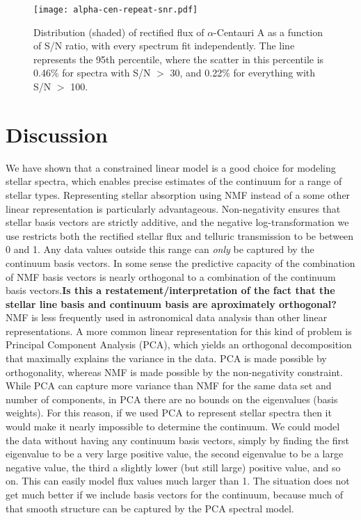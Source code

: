 \documentclass[modern]{aastex631}
\newcommand{\ajw}[1]{\textbf{#1}}
\begin{document}
\begin{figure}
    \texttt{[image: alpha-cen-repeat-snr.pdf]}
    \caption{Distribution (shaded) of rectified flux of $\alpha$-Centauri A as a function of S/N ratio, with every spectrum fit independently. The line represents the 95th percentile, where the scatter in this percentile is 0.46\% for spectra with S/N $>$ 30, and 0.22\% for everything with S/N $>$ 100. \label{fig:alpha-cen-wrt-snr}}
\end{figure}

\section{Discussion}\label{sec:discussion}

We have shown that a constrained linear model is a good choice for modeling stellar spectra, which enables precise estimates of the continuum for a range of stellar types. Representing stellar absorption using NMF instead of a some other linear representation is particularly advantageous. Non-negativity ensures that stellar basis vectors are strictly additive, and the negative log-transformation we use restricts both the rectified stellar flux and telluric transmission to be between 0 and 1. Any data values outside this range can \emph{only} be captured by the continuum basis vectors. In some sense the predictive capacity of the combination of NMF basis vectors is nearly orthogonal to a combination of the continuum basis vectors.\ajw{Is this a restatement/interpretation of the fact that the stellar line basis and continuum basis are aproximately orthogonal?}\\

NMF is less frequently used in astronomical data analysis than other linear representations. A more common linear representation for this kind of problem is Principal Component Analysis (PCA), which yields an orthogonal decomposition that maximally explains the variance in the data. PCA is made possible by orthogonality, whereas NMF is made possible by the non-negativity constraint. While PCA can capture more variance than NMF for the same data set and number of components, in PCA there are no bounds on the eigenvalues (basis weights). For this reason, if we used PCA to represent stellar spectra then it would make it nearly impossible to determine the continuum. We could model the data without having any continuum basis vectors, simply by finding the first eigenvalue to be a very large positive value, the second eigenvalue to be a large negative value, the third a slightly lower (but still large) positive value, and so on. This can easily model flux values much larger than 1. The situation does not get much better if we include basis vectors for the continuum, because much of that smooth structure can be captured by the PCA spectral model.\\
\end{document}
